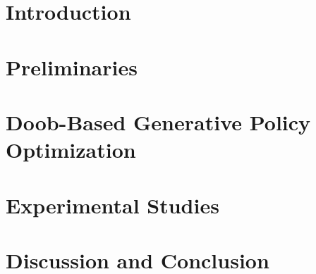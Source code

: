 \documentclass{article}
\title{}
\author{
\textbf{
Maojiang Su$^{\dagger,\natural}$
\hspace{0.7em}
Qijie Zhu$^{\ddag}$
\hspace{0.7em}
Yu Xiao
$^{\dagger}$
\hspace{0.7em}
Shuyang Yu$^{\dagger}$
}
\\
\vspace{-0.7em}
\textbf{
Minshuo Chen$^{\S}$
\hspace{0.7em}
Zhaoran Wang$^{\S,\dagger}$
\hspace{0.7em}
Han Liu$^{\dagger,\ddag,\natural}$
}
\\
\vspace{0.7em}
\begin{minipage}{0.95\textwidth}
\raggedright
\small
$^{\dagger\;}$Department of Computer Science,
Northwestern University, Evanston, IL 60208, USA
\\
$^{\ddag\;}$Department of Statistics and Data Science,
Northwestern University, Evanston, IL 60208, USA
\\
$^{\S\;}$Department of Industrial Engineering and Management Sciences,
\\
\hphantom{$^{\S\;}$}Northwestern University, Evanston, IL 60208, USA
\\
$^{\natural\;}$Center for Foundation Models and Generative AI,
Northwestern University, Evanston, IL 60208, USA
\end{minipage}
\\
\vspace{0.45em}
{\footnotesize
\href{https://maojiangsu.github.io/DoobPO/}
{\texttt{https://maojiangsu.github.io/DoobPO/}}
}
}
\begin{document}
\setlength{\abovedisplayskip}{2pt}
\setlength{\abovedisplayshortskip}{2pt}
\setlength{\belowdisplayskip}{2pt}
\setlength{\belowdisplayshortskip}{2pt}

\maketitle
\vspace{-2.2em}
\begin{abstract}
\vspace{-1.5em}

\end{abstract}

\section{Introduction}
\label{sec:intro}



\section{Preliminaries}
\label{sec:background}



\section{Doob-Based Generative Policy Optimization}
\label{sec:method}



\section{Experimental Studies}
\label{sec:exp}


\section{Discussion and Conclusion}
\label{sec:conclusion}


\clearpage


% 




% 
% 
% 

\end{document}
